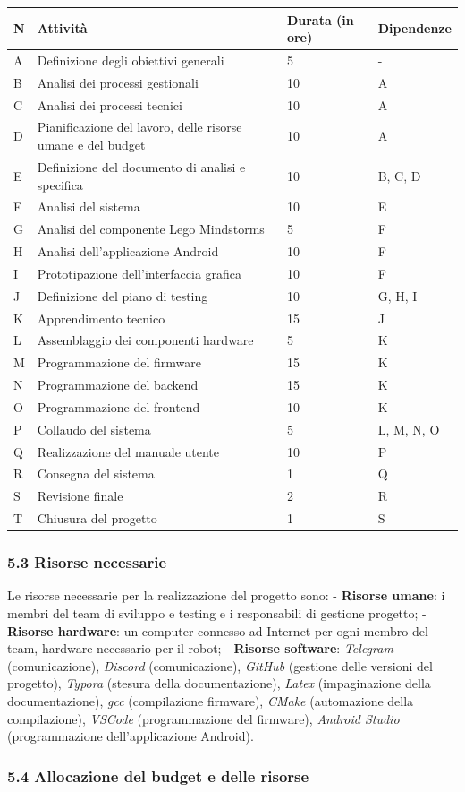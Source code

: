 \documentclass[]{article}
\begin{document}
\begin{longtable}[]{@{}llll@{}}
\toprule
N & Attività & Durata (in ore) & Dipendenze\tabularnewline
\midrule
\endhead
A & Definizione degli obiettivi generali & 5 & -\tabularnewline
B & Analisi dei processi gestionali & 10 & A\tabularnewline
C & Analisi dei processi tecnici & 10 & A\tabularnewline
D & Pianificazione del lavoro, delle risorse umane e del budget & 10 &
A\tabularnewline
E & Definizione del documento di analisi e specifica & 10 & B, C,
D\tabularnewline
F & Analisi del sistema & 10 & E\tabularnewline
G & Analisi del componente Lego Mindstorms & 5 & F\tabularnewline
H & Analisi dell'applicazione Android & 10 & F\tabularnewline
I & Prototipazione dell'interfaccia grafica & 10 & F\tabularnewline
J & Definizione del piano di testing & 10 & G, H, I\tabularnewline
K & Apprendimento tecnico & 15 & J\tabularnewline
L & Assemblaggio dei componenti hardware & 5 & K\tabularnewline
M & Programmazione del firmware & 15 & K\tabularnewline
N & Programmazione del backend & 15 & K\tabularnewline
O & Programmazione del frontend & 10 & K\tabularnewline
P & Collaudo del sistema & 5 & L, M, N, O\tabularnewline
Q & Realizzazione del manuale utente & 10 & P\tabularnewline
R & Consegna del sistema & 1 & Q\tabularnewline
S & Revisione finale & 2 & R\tabularnewline
T & Chiusura del progetto & 1 & S\tabularnewline
\bottomrule
\end{longtable}

\hypertarget{risorse-necessarie}{%
\subsubsection{5.3 Risorse necessarie}\label{risorse-necessarie}}

Le risorse necessarie per la realizzazione del progetto sono: -
\textbf{Risorse umane}: i membri del team di sviluppo e testing e i
responsabili di gestione progetto; - \textbf{Risorse hardware}: un
computer connesso ad Internet per ogni membro del team, hardware
necessario per il robot; - \textbf{Risorse software}: \emph{Telegram}
(comunicazione), \emph{Discord} (comunicazione), \emph{GitHub} (gestione
delle versioni del progetto), \emph{Typora} (stesura della
documentazione), \emph{Latex} (impaginazione della documentazione),
\emph{gcc} (compilazione firmware), \emph{CMake} (automazione della
compilazione), \emph{VSCode} (programmazione del firmware),
\emph{Android Studio} (programmazione dell'applicazione Android).

\hypertarget{allocazione-del-budget-e-delle-risorse}{%
\subsubsection{5.4 Allocazione del budget e delle
risorse}\label{allocazione-del-budget-e-delle-risorse}}
\end{document}
